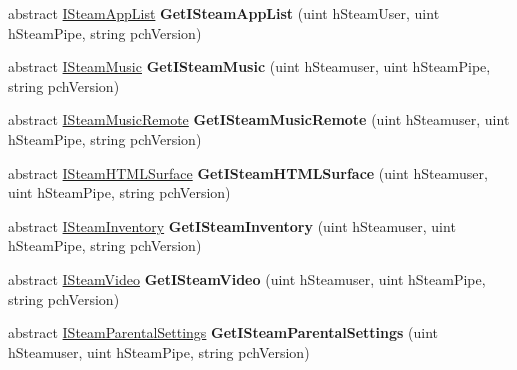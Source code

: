 \begin{DoxyCompactItemize}
\mbox{\label{class_valve_1_1_steamworks_1_1_i_steam_client_ab2aa297a72ecdb731916318b89db2827}} 
abstract \hyperlink{class_valve_1_1_steamworks_1_1_i_steam_app_list}{I\+Steam\+App\+List} {\bfseries Get\+I\+Steam\+App\+List} (uint h\+Steam\+User, uint h\+Steam\+Pipe, string pch\+Version)
\item 
\mbox{\label{class_valve_1_1_steamworks_1_1_i_steam_client_a53e8d804fff94a3d7827c8965740346b}} 
abstract \hyperlink{class_valve_1_1_steamworks_1_1_i_steam_music}{I\+Steam\+Music} {\bfseries Get\+I\+Steam\+Music} (uint h\+Steamuser, uint h\+Steam\+Pipe, string pch\+Version)
\item 
\mbox{\label{class_valve_1_1_steamworks_1_1_i_steam_client_a8b6144b1890f43e2d71991127255c30d}} 
abstract \hyperlink{class_valve_1_1_steamworks_1_1_i_steam_music_remote}{I\+Steam\+Music\+Remote} {\bfseries Get\+I\+Steam\+Music\+Remote} (uint h\+Steamuser, uint h\+Steam\+Pipe, string pch\+Version)
\item 
\mbox{\label{class_valve_1_1_steamworks_1_1_i_steam_client_a8b6a5c868fa8c38d687869deed664062}} 
abstract \hyperlink{class_valve_1_1_steamworks_1_1_i_steam_h_t_m_l_surface}{I\+Steam\+H\+T\+M\+L\+Surface} {\bfseries Get\+I\+Steam\+H\+T\+M\+L\+Surface} (uint h\+Steamuser, uint h\+Steam\+Pipe, string pch\+Version)
\item 
\mbox{\label{class_valve_1_1_steamworks_1_1_i_steam_client_a98fa8b46394b021c680c29cef221b003}} 
abstract \hyperlink{class_valve_1_1_steamworks_1_1_i_steam_inventory}{I\+Steam\+Inventory} {\bfseries Get\+I\+Steam\+Inventory} (uint h\+Steamuser, uint h\+Steam\+Pipe, string pch\+Version)
\item 
\mbox{\label{class_valve_1_1_steamworks_1_1_i_steam_client_aa8ff02cfbdc9cd94262196d1974bdf76}} 
abstract \hyperlink{class_valve_1_1_steamworks_1_1_i_steam_video}{I\+Steam\+Video} {\bfseries Get\+I\+Steam\+Video} (uint h\+Steamuser, uint h\+Steam\+Pipe, string pch\+Version)
\item 
\mbox{\label{class_valve_1_1_steamworks_1_1_i_steam_client_ad9f8880b4d264a15cc6f6b13217f8420}} 
abstract \hyperlink{class_valve_1_1_steamworks_1_1_i_steam_parental_settings}{I\+Steam\+Parental\+Settings} {\bfseries Get\+I\+Steam\+Parental\+Settings} (uint h\+Steamuser, uint h\+Steam\+Pipe, string pch\+Version)
\end{DoxyCompactItemize}


